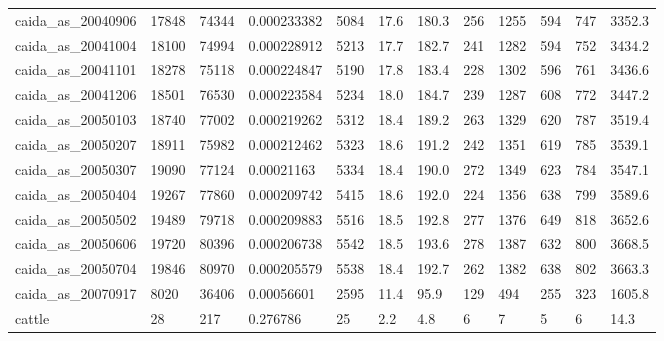\begin{longtable}{llllllllllll}
 caida\_as\_20040906                                  & 17848      & 74344     & 0.000233382 & 5084  & 17.6   & 180.3  & 256   & 1255   & 594    & 747    & 3352.3  \\
 caida\_as\_20041004                                  & 18100      & 74994     & 0.000228912 & 5213  & 17.7   & 182.7  & 241   & 1282   & 594    & 752    & 3434.2  \\
 caida\_as\_20041101                                  & 18278      & 75118     & 0.000224847 & 5190  & 17.8   & 183.4  & 228   & 1302   & 596    & 761    & 3436.6  \\
 caida\_as\_20041206                                  & 18501      & 76530     & 0.000223584 & 5234  & 18.0   & 184.7  & 239   & 1287   & 608    & 772    & 3447.2  \\
 caida\_as\_20050103                                  & 18740      & 77002     & 0.000219262 & 5312  & 18.4   & 189.2  & 263   & 1329   & 620    & 787    & 3519.4  \\
 caida\_as\_20050207                                  & 18911      & 75982     & 0.000212462 & 5323  & 18.6   & 191.2  & 242   & 1351   & 619    & 785    & 3539.1  \\
 caida\_as\_20050307                                  & 19090      & 77124     & 0.00021163  & 5334  & 18.4   & 190.0  & 272   & 1349   & 623    & 784    & 3547.1  \\
 caida\_as\_20050404                                  & 19267      & 77860     & 0.000209742 & 5415  & 18.6   & 192.0  & 224   & 1356   & 638    & 799    & 3589.6  \\
 caida\_as\_20050502                                  & 19489      & 79718     & 0.000209883 & 5516  & 18.5   & 192.8  & 277   & 1376   & 649    & 818    & 3652.6  \\
 caida\_as\_20050606                                  & 19720      & 80396     & 0.000206738 & 5542  & 18.5   & 193.6  & 278   & 1387   & 632    & 800    & 3668.5  \\
 caida\_as\_20050704                                  & 19846      & 80970     & 0.000205579 & 5538  & 18.4   & 192.7  & 262   & 1382   & 638    & 802    & 3663.3  \\
 caida\_as\_20070917                                  & 8020       & 36406     & 0.00056601  & 2595  & 11.4   & 95.9   & 129   & 494    & 255    & 323    & 1605.8  \\
 cattle                                             & 28         & 217       & 0.276786    & 25    & 2.2    & 4.8    & 6     & 7      & 5      & 6      & 14.3    \\

\end{longtable}
